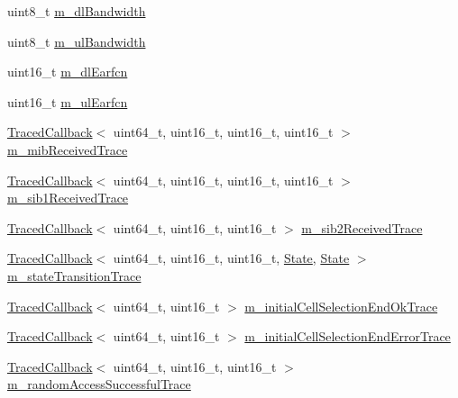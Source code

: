 \begin{DoxyCompactItemize}
\item 
uint8\+\_\+t \hyperlink{classns3_1_1LteUeRrc_a75859752f8175432e4a23b2d7079bfde}{m\+\_\+dl\+Bandwidth}
\item 
uint8\+\_\+t \hyperlink{classns3_1_1LteUeRrc_a6ae2139e198c3ae86b03d2564a4e8c2a}{m\+\_\+ul\+Bandwidth}
\item 
uint16\+\_\+t \hyperlink{classns3_1_1LteUeRrc_af8019b7697bea32f260e8dbb7668730f}{m\+\_\+dl\+Earfcn}
\item 
uint16\+\_\+t \hyperlink{classns3_1_1LteUeRrc_a6ff890b601bbc956914219d51adef66f}{m\+\_\+ul\+Earfcn}
\item 
\hyperlink{classns3_1_1TracedCallback}{Traced\+Callback}$<$ uint64\+\_\+t, uint16\+\_\+t, uint16\+\_\+t, uint16\+\_\+t $>$ \hyperlink{classns3_1_1LteUeRrc_a1bca18358e1230c8ac2f83a8a5d735b2}{m\+\_\+mib\+Received\+Trace}
\item 
\hyperlink{classns3_1_1TracedCallback}{Traced\+Callback}$<$ uint64\+\_\+t, uint16\+\_\+t, uint16\+\_\+t, uint16\+\_\+t $>$ \hyperlink{classns3_1_1LteUeRrc_a6c744274b24e206588a34dc05ca983ff}{m\+\_\+sib1\+Received\+Trace}
\item 
\hyperlink{classns3_1_1TracedCallback}{Traced\+Callback}$<$ uint64\+\_\+t, uint16\+\_\+t, uint16\+\_\+t $>$ \hyperlink{classns3_1_1LteUeRrc_a9fc4a1a9138bae6f5192d0b716ca3da0}{m\+\_\+sib2\+Received\+Trace}
\item 
\hyperlink{classns3_1_1TracedCallback}{Traced\+Callback}$<$ uint64\+\_\+t, uint16\+\_\+t, uint16\+\_\+t, \hyperlink{classns3_1_1LteUeRrc_a241012c291e75681150c9214e11f6145}{State}, \hyperlink{classns3_1_1LteUeRrc_a241012c291e75681150c9214e11f6145}{State} $>$ \hyperlink{classns3_1_1LteUeRrc_a269fed2358610ca08549e8d1f211623b}{m\+\_\+state\+Transition\+Trace}
\item 
\hyperlink{classns3_1_1TracedCallback}{Traced\+Callback}$<$ uint64\+\_\+t, uint16\+\_\+t $>$ \hyperlink{classns3_1_1LteUeRrc_a84f159549c4095a94197657e51215062}{m\+\_\+initial\+Cell\+Selection\+End\+Ok\+Trace}
\item 
\hyperlink{classns3_1_1TracedCallback}{Traced\+Callback}$<$ uint64\+\_\+t, uint16\+\_\+t $>$ \hyperlink{classns3_1_1LteUeRrc_a32e24fd29de39fe7397235348e6a32d7}{m\+\_\+initial\+Cell\+Selection\+End\+Error\+Trace}
\item 
\hyperlink{classns3_1_1TracedCallback}{Traced\+Callback}$<$ uint64\+\_\+t, uint16\+\_\+t, uint16\+\_\+t $>$ \hyperlink{classns3_1_1LteUeRrc_ad5da54bebd73bd18a6ccbd77b5a87d09}{m\+\_\+random\+Access\+Successful\+Trace}
\item 

\end{DoxyCompactItemize}
